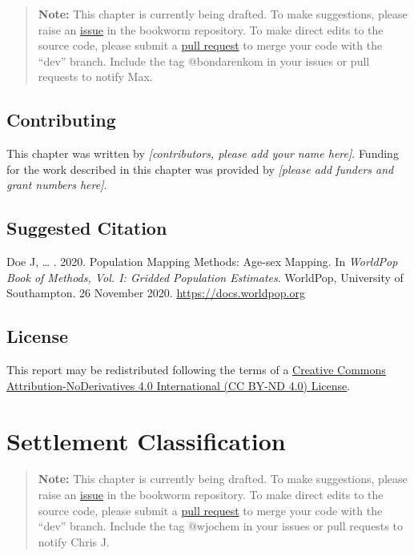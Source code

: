 \documentclass[]{book}
\begin{document}
\begin{quote}
\textbf{Note:} This chapter is currently being drafted. To make
suggestions, please raise an
\href{https://github.com/wpgp/bookworm/issues}{issue} in the bookworm
repository. To make direct edits to the source code, please submit a
\href{https://github.com/wpgp/bookworm/pulls}{pull request} to merge
your code with the ``dev'' branch. Include the tag @bondarenkom in your
issues or pull requests to notify Max.
\end{quote}

\section*{Contributing}\label{contributing-3}

This chapter was written by \emph{{[}contributors, please add your name
here{]}}. Funding for the work described in this chapter was provided by
\emph{{[}please add funders and grant numbers here{]}}.

\section*{Suggested Citation}\label{suggested-citation-3}

Doe J, \ldots{} . 2020. Population Mapping Methods: Age-sex Mapping. In
\emph{WorldPop Book of Methods, Vol. I: Gridded Population Estimates}.
WorldPop, University of Southampton. 26 November 2020.
\url{https://docs.worldpop.org}

\section*{License}\label{license-1}

This report may be redistributed following the terms of a
\href{https://creativecommons.org/licenses/by-nd/4.0/}{Creative Commons
Attribution-NoDerivatives 4.0 International (CC BY-ND 4.0) License}.

\hypertarget{settlement-classification}{\chapter{Settlement
Classification}\label{settlement-classification}}

\begin{quote}
\textbf{Note:} This chapter is currently being drafted. To make
suggestions, please raise an
\href{https://github.com/wpgp/bookworm/issues}{issue} in the bookworm
repository. To make direct edits to the source code, please submit a
\href{https://github.com/wpgp/bookworm/pulls}{pull request} to merge
your code with the ``dev'' branch. Include the tag @wjochem in your
issues or pull requests to notify Chris J.
\end{quote}
\end{document}
